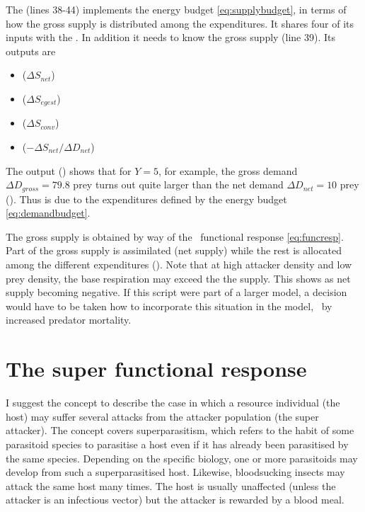 The  (lines 38-44) implements the energy budget \eqref{eq:supplybudget}, in terms of how the gross supply is distributed among the expenditures. It shares four of its inputs with the . In addition it needs to know the gross supply (line 39). Its outputs are

\begin{itemize}
\item {} ($\Delta S_{net}$)
\item {} ($\Delta S_{egest}$)
\item {} ($\Delta S_{conv}$)
\item {} ($-\Delta S_{net}/\Delta D_{net}$)
\end{itemize}

The output () shows that for $Y=5$, for example, the gross demand $\Delta D_{gross}=79.8$ prey turns out quite larger than the net demand $\Delta D_{net}=10$ prey (). Thus is due to the expenditures defined by the energy budget \eqref{eq:demandbudget}.

The gross supply is obtained by way of the \GB\ functional response \eqref{eq:funcresp}. Part of the gross supply is assimilated (net supply) while the rest is allocated among the different expenditures (). Note that at high attacker density and low prey density, the base respiration may exceed the the supply. This shows as net supply becoming negative. If this script were part of a larger model, a decision would have to be taken how to incorporate this situation in the model, \eg\ by increased predator mortality.

\FloatBarrier
\section{The super functional response}
\label{ch:super-functional-response}
I suggest the concept  to describe the case in which a resource individual (the host) may suffer several attacks from the attacker population (the super attacker). The concept covers superparasitism, which refers to the habit of some parasitoid species to parasitise a host even if it has already been parasitised by the same species. Depending on the specific biology, one or more parasitoids may develop from such a superparasitised host. Likewise, bloodsucking insects may attack the same host many times. The host is usually unaffected (unless the attacker is an infectious vector) but the attacker is rewarded by a blood meal. 

